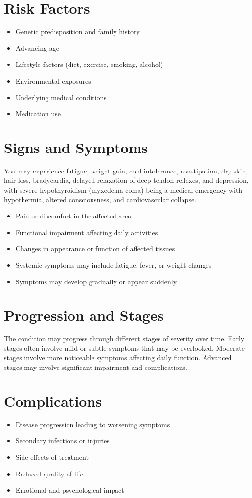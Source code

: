 \section{Risk Factors}
\begin{itemize}[noitemsep]
  \item Genetic predisposition and family history
  \item Advancing age
  \item Lifestyle factors (diet, exercise, smoking, alcohol)
  \item Environmental exposures
  \item Underlying medical conditions
  \item Medication use
\end{itemize}
\section{Signs and Symptoms}
You may experience fatigue, weight gain, cold intolerance, constipation, dry skin, hair loss, bradycardia, delayed relaxation of deep tendon reflexes, and depression, with severe hypothyroidism (myxedema coma) being a medical emergency with hypothermia, altered consciousness, and cardiovascular collapse.

\begin{itemize}[noitemsep]
  \item Pain or discomfort in the affected area
  \item Functional impairment affecting daily activities
  \item Changes in appearance or function of affected tissues
  \item Systemic symptoms may include fatigue, fever, or weight changes
  \item Symptoms may develop gradually or appear suddenly
\end{itemize}
\section{Progression and Stages}
The condition may progress through different stages of severity over time. Early stages often involve mild or subtle symptoms that may be overlooked. Moderate stages involve more noticeable symptoms affecting daily function. Advanced stages may involve significant impairment and complications.
\section{Complications}
\begin{itemize}[noitemsep]
  \item Disease progression leading to worsening symptoms
  \item Secondary infections or injuries
  \item Side effects of treatment
  \item Reduced quality of life
  \item Emotional and psychological impact
\end{itemize}
